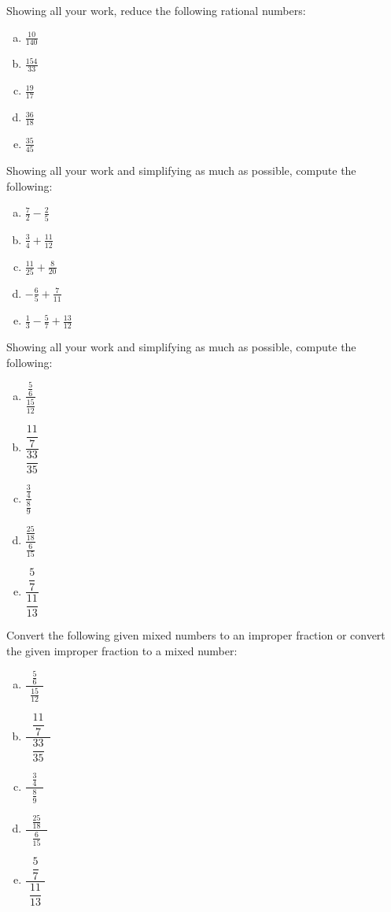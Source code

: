 \documentclass[11pt,letterpaper]{article}
\begin{document}

 Showing all your work, reduce the following rational numbers:
	\begin{enumerate}[(a)]
	\item $\frac{10}{140}$
	\item $\frac{154}{33}$
	\item $\frac{19}{17}$
	\item $\frac{36}{18}$
	\item $\frac{35}{45}$
	\end{enumerate}



\newpage



 Showing all your work and simplifying as much as possible, compute the following:
	\begin{enumerate}[(a)]
	\item $\frac{7}{2} - \frac{2}{5}$
	\item $\frac{3}{4} + \frac{11}{12}$
	\item $\frac{11}{25} + \frac{8}{20}$
	\item $-\frac{6}{5} + \frac{7}{11}$
	\item $\frac{1}{3} - \frac{5}{7} + \frac{13}{12}$
	\end{enumerate}



\newpage



 Showing all your work and simplifying as much as possible, compute the following:
	\begin{enumerate}[(a)]
	\item $\dfrac{\frac{5}{6}}{\frac{15}{12}}$
	\item $\dfrac{\dfrac{11}{7}}{\dfrac{33}{35}}$
	\item $\dfrac{\frac{3}{4}}{\frac{8}{9}}$
	\item $\dfrac{\frac{25}{18}}{\frac{6}{15}}$
	\item $\dfrac{\dfrac{5}{7}}{\dfrac{11}{13}}$
	\end{enumerate}



\newpage



 Convert the following given mixed numbers to an improper fraction or convert the given improper fraction to a mixed number:
	\begin{enumerate}[(a)]
	\item $\dfrac{\;\;\frac{5}{6}\;\;}{\frac{15}{12}}$
	\item $\dfrac{\;\;\dfrac{11}{7}\;\;}{\dfrac{33}{35}}$
	\item $\dfrac{\;\;\frac{3}{4}\;\;}{\frac{8}{9}}$
	\item $\dfrac{\;\;\frac{25}{18}\;\;}{\frac{6}{15}}$
	\item $\dfrac{\;\;\dfrac{5}{7}\;\;}{\dfrac{11}{13}}$
	\end{enumerate} \pspace
\end{document}
